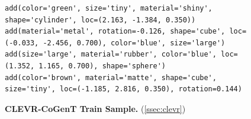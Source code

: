 \begin{figure}
\centering
{}
\begin{verbatim}
add(color='green', size='tiny', material='shiny', shape='cylinder', loc=(2.163, -1.384, 0.350))
add(material='metal', rotation=-0.126, shape='cube', loc=(-0.033, -2.456, 0.700), color='blue', size='large')
add(size='large', material='rubber', color='blue', loc=(1.352, 1.165, 0.700), shape='sphere')
add(color='brown', material='matte', shape='cube', size='tiny', loc=(-1.185, 2.816, 0.350), rotation=0.144)
\end{verbatim}
\caption{\textbf{CLEVR-CoGenT Train Sample.} (\cref{ssec:clevr})}
\label{fig:code_clevr}
\end{figure}